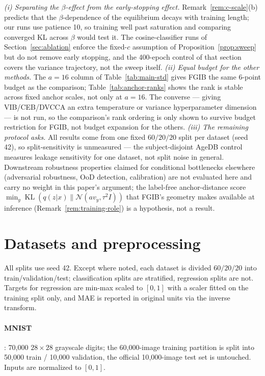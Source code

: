 \documentclass{article} %
\newcommand{\KLd}{\operatorname{KL}}
\newcommand{\Ncal}{\mathcal{N}}
\begin{document}
\emph{(i) Separating the
$\beta$-effect from the early-stopping effect.} Remark~\ref{rem:c-scale}(b) predicts that
the $\beta$-dependence of the equilibrium decays with training length; our runs use
patience 10, so training well past saturation and comparing converged KL across $\beta$
would test it. The cosine-classifier runs of Section~\ref{sec:ablation} enforce the
fixed-$c$ assumption of Proposition~\ref{prop:sweep} but do not remove early stopping,
and the 400-epoch control of that section covers the variance trajectory, not the
sweep itself.
\emph{(ii) Equal budget for the other methods.} The $a=16$ column of
Table~\ref{tab:main-std} gives FGIB the same 6-point budget as the comparison;
Table~\ref{tab:anchor-ranks} shows the rank is stable across fixed anchor scales, not
only at $a=16$. The
converse --- giving VIB/CEB/DVCCA an extra temperature or variance hyperparameter
dimension --- is not run, so the comparison's rank ordering is only shown to survive
budget restriction for FGIB, not budget expansion for the others. \emph{(iii) The
remaining protocol asks.} All results come from one fixed $60/20/20$ split per dataset
(seed 42), so split-sensitivity is unmeasured --- the subject-disjoint AgeDB control
measures leakage sensitivity for one dataset, not split noise in general. Downstream
robustness properties claimed for conditional bottlenecks elsewhere (adversarial
robustness, OoD detection, calibration) are not evaluated here and carry no weight in
this paper's argument; the label-free anchor-distance score
$\min_y \KLd(q(z|x)\|\Ncal(a v_y, \tau^2 I))$ that FGIB's geometry makes available at
inference (Remark~\ref{rem:training-role}) is a hypothesis, not a result.

\section{Datasets and preprocessing}
\label{app:data}

All splits use seed 42. Except where noted, each dataset is divided $60/20/20$ into
train/validation/test; classification splits are stratified, regression splits are not.
Targets for regression are min-max scaled to $[0,1]$ with a scaler fitted on the training
split only, and MAE is reported in original units via the inverse transform.

\paragraph{MNIST} \citep{lecun1998mnist}: 70{,}000 $28\times28$ grayscale digits; the
60{,}000-image training partition is split into 50{,}000 train / 10{,}000 validation, the
official 10{,}000-image test set is untouched. Inputs are normalized to $[0,1]$.
\end{document}
